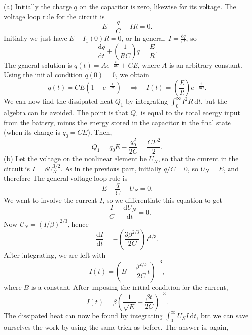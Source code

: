 \documentclass[../TST.tex]{subfiles}
\begin{document}
\ifprob \else
\begin{solution} 
(a) Initially the charge $q$ on the capacitor is zero, likewise for its voltage. The voltage loop rule for the circuit is
\begin{equation*}
E-\frac{q}{C}-IR=0
.
\end{equation*}
Initially we just have $E-I_1(0)R=0$, or  In general, $I=\frac{\mathrm{d}q}{\mathrm{d}t}$, so
\begin{equation*}
\frac{\mathrm{d}q}{\mathrm{d}t}+\left( \frac{1}{RC}\right)q=\frac{E}{R}
.
\end{equation*}
The general solution is $q(t)=Ae^{-\frac{t}{RC}}+CE$, where $A$ is an arbitrary constant. Using the initial condition $q(0)=0$, we obtain
\begin{equation*}
	q(t)=CE\left(1-e^{-\frac{t}{RC}}\right) \quad\Rightarrow\quad \boxed{I(t)=\left(\frac{E}{R}\right) e^{-\frac{t}{RC}}.}
\end{equation*}
We can now find the dissipated heat $Q_1$ by integrating $\int_0^\infty I^2R\,\mathrm{d}t$, but the algebra can be avoided. The point is that $Q_1$ is equal to the total energy input from the battery, minus the energy stored in the capacitor in the final state (when its charge is $q_0=CE$). Then,
\begin{equation*}
	Q_1=q_0E-\frac{q_0^2}{2C}=\boxed{\frac{CE^2}{2}.}
\end{equation*}
(b) Let the voltage on the nonlinear element be $U_N$, so that the current in the circuit is $I=\beta U_N^{3/2}$. As in the previous part, initially $q/C=0$, so $U_N=E$, and therefore   The general voltage loop rule is
\begin{equation*}
E-\frac{q}{C}-U_N=0
.
\end{equation*}
We want to involve the current $I$, so we differentiate this equation to get
\begin{equation*}
-\frac{I}{C}-\frac{\mathrm{d}U_N}{\mathrm{d}t}=0
.
\end{equation*}
Now $U_N=(I/\beta)^{2/3}$, hence
\begin{equation*}
	\frac{\mathrm{d}I}{\mathrm{d}t}=-\left(\frac{3\beta^{2/3}}{2C}\right) I^{4/3}
.
\end{equation*}
After integrating, we are left with 
\begin{equation*}
	I(t)=\left(B+\frac{\beta^{2/3}}{2C}t\right)^{-3}
,
\end{equation*}
where $B$ is a constant. After imposing the initial condition for the current,
\begin{equation*}
	\boxed{I(t)=\beta \left(\frac{1}{\sqrt{E}}+ \frac{\beta t}{2C}\right)^{-3}.}
\end{equation*}
The dissipated heat can now be found by integrating $\int_0^\infty U_NI\,\mathrm{d}t$, but we can save ourselves the work by using the same trick as before. The answer is, again, 
\end{solution}

\fi
\ifprob 
	\clearpage
\else 
	\vspace*{10mm}
\fi
\end{document}
